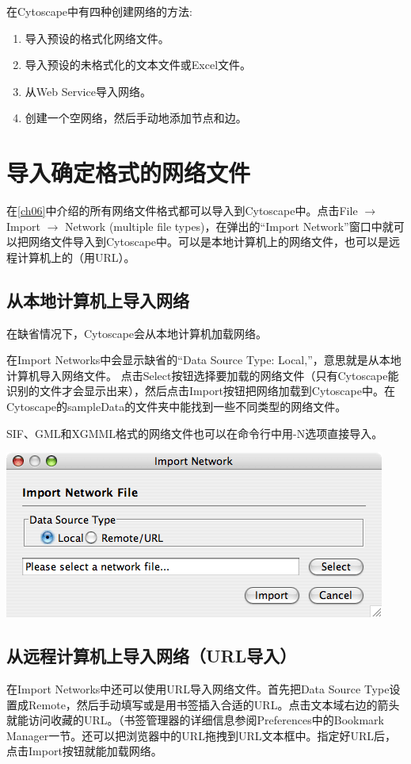 在Cytoscape中有四种创建网络的方法:
\begin{enumerate}
\item 导入预设的格式化网络文件。
\item 导入预设的未格式化的文本文件或Excel文件。
\item 从Web Service导入网络。
\item 创建一个空网络，然后手动地添加节点和边。
\end{enumerate}
\section{导入确定格式的网络文件}

在\ref{ch06}中介绍的所有网络文件格式都可以导入到Cytoscape中。点击File $\rightarrow$ Import $\rightarrow$ Network (multiple file types)，在弹出的``Import Network''窗口中就可以把网络文件导入到Cytoscape中。可以是本地计算机上的网络文件，也可以是远程计算机上的（用URL）。

 \subsection{从本地计算机上导入网络}
在缺省情况下，Cytoscape会从本地计算机加载网络。

在Import Networks中会显示缺省的``Data Source Type: Local,''，意思就是从本地计算机导入网络文件。 点击Select按钮选择要加载的网络文件（只有Cytoscape能识别的文件才会显示出来），然后点击Import按钮把网络加载到Cytoscape中。在Cytoscape的sampleData的文件夹中能找到一些不同类型的网络文件。 

SIF、GML和XGMML格式的网络文件也可以在命令行中用-N选项直接导入。

\begin{center}
\includegraphics[width=.6\textwidth]{images/network_import_dialog1_25.png} 
\end{center}

\subsection{从远程计算机上导入网络（URL导入）}
在Import Networks中还可以使用URL导入网络文件。首先把Data Source Type设置成Remote，然后手动填写或是用书签插入合适的URL。点击文本域右边的箭头就能访问收藏的URL。（书签管理器的详细信息参阅Preferences中的Bookmark Manager一节。还可以把浏览器中的URL拖拽到URL文本框中。指定好URL后，点击Import按钮就能加载网络。

